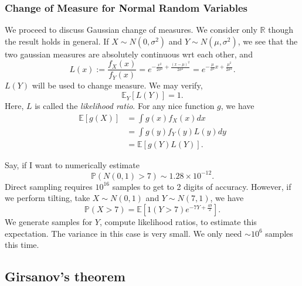 \subsubsection{Change of Measure for Normal Random Variables}

We proceed to discuss Gaussian change of measures. We consider only $\mathbb{R}$ though the result holds in general. If $X\sim N(0, \sigma^2)$ and $Y \sim N(\mu, \sigma^2)$, we see that the two gaussian measures are absolutely continuous wrt each other, and
 \[
	 L(x) := \frac{f_X(x)}{f_Y(x)} = e^{-\frac{x^2}{2 \sigma^2} + \frac{(x - \mu)^2}{2 \sigma^2}} = e^{- \frac{\mu}{\sigma^2}x + \frac{\mu^2}{ 2 \sigma^2}}
.\] 
$L(Y)$ will be used to change measure. We may verify,
\[
	\mathbb{E}_Y[L(Y)] = 1
.\] 
Here, $L$ is called the \textit{likelihood ratio}. For any nice function $g$, we have
\begin{align*}
	\mathbb{E}\left[ g(X) \right] 
	&= \int g(x) f_{X}(x) dx \\
	&= \int g(y) f_{Y}(y) L(y) dy \\
	&= \mathbb{E}\left[ g(Y) L(Y) \right]
.\end{align*}

\begin{example}
	
Say, if I want to numerically estimate
\[
	\mathbb{P}\left( N(0, 1) > 7 \right) \sim  1.28 \times 10^{-12}
.\] 
Direct sampling requires $10^{16}$ samples to get to 2 digits of accuracy. However, if we perform tilting, take $X \sim N(0, 1)$ and $Y \sim N(7, 1)$, we have
\[
	\mathbb{P}(X > 7) = \mathbb{E}\left[ 1(Y > 7) e^{- 7 Y + \frac{49}{2}} \right] 
.\] 
We generate samples for $Y$, compute likelihood ratios, to estimate this expectation. The variance in this case is very small. We only need $\sim 10^6$ samples this time.

\end{example}

\subsection{Girsanov's theorem}


